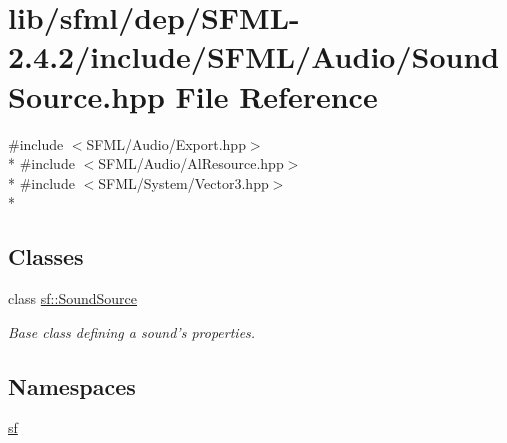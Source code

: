 \hypertarget{sfml_2dep_2_s_f_m_l-2_84_82_2include_2_s_f_m_l_2_audio_2_sound_source_8hpp}{\section{lib/sfml/dep/\-S\-F\-M\-L-\/2.4.2/include/\-S\-F\-M\-L/\-Audio/\-Sound\-Source.hpp File Reference}
\label{sfml_2dep_2_s_f_m_l-2_84_82_2include_2_s_f_m_l_2_audio_2_sound_source_8hpp}
}
{\ttfamily \#include $<$S\-F\-M\-L/\-Audio/\-Export.\-hpp$>$}\\*
{\ttfamily \#include $<$S\-F\-M\-L/\-Audio/\-Al\-Resource.\-hpp$>$}\\*
{\ttfamily \#include $<$S\-F\-M\-L/\-System/\-Vector3.\-hpp$>$}\\*
\subsection*{Classes}
\begin{DoxyCompactItemize}
\item 
class \hyperlink{classsf_1_1_sound_source}{sf\-::\-Sound\-Source}
\begin{DoxyCompactList}\small\item\em Base class defining a sound's properties. \end{DoxyCompactList}\end{DoxyCompactItemize}
\subsection*{Namespaces}
\begin{DoxyCompactItemize}
\item 
\hyperlink{namespacesf}{sf}
\end{DoxyCompactItemize}
